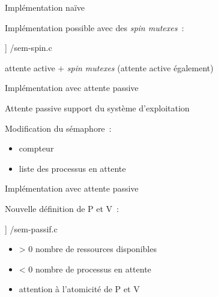 

\begin {frame} {Implémentation naïve}

    Implémentation possible avec des \emph {spin mutexes}~:

    \scriptsize\lstmonstyle] {\inc/sem-spin.c}

    \implique attente active + \emph {spin mutexes} (attente active également)

\end {frame}

\begin {frame} {Implémentation avec attente passive}

    Attente passive \implique support du système d'exploitation

    \vspace* {3mm}

    Modification du sémaphore~:
    \begin {itemize}
	\item compteur
	\item liste des processus en attente
    \end {itemize}
\end {frame}

\begin {frame} {Implémentation avec attente passive}

    Nouvelle définition de P et V~:

    \scriptsize\lstmonstyle] {\inc/sem-passif.c}

    \begin {itemize}
	\item {} > 0 \implique nombre de ressources disponibles
	\item {} < 0 \implique nombre de processus en attente
	\item attention à l'atomicité de P et V
    \end {itemize}

\end {frame}


